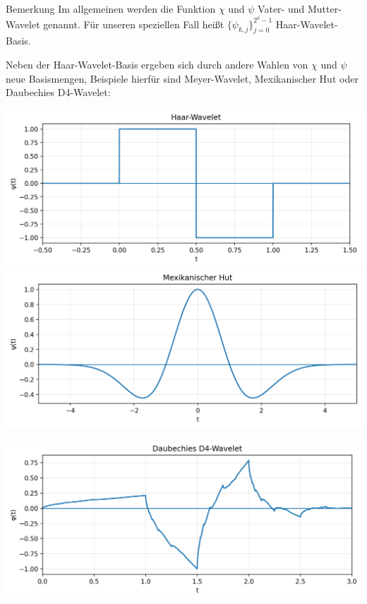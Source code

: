 \begin{colbox}{Bemerkung}
  Im allgemeinen werden die Funktion $\chi$ und $\psi$ Vater- und Mutter-Wavelet genannt. Für unseren speziellen Fall 
  heißt $\{\psi_{k,j}\}_{j=0}^{2^k-1}$ Haar-Wavelet-Basis. 

  Neben der Haar-Wavelet-Basis ergeben sich durch andere Wahlen von $\chi$ und $\psi$ neue Basismengen, Beispiele 
  hierfür sind Meyer-Wavelet, Mexikanischer Hut oder Daubechies D4-Wavelet:

  \begin{minipage}[t]{.49\textwidth}
    \includegraphics[width=\linewidth]{figures/haar_wavelet.png}\\[4pt]
    \includegraphics[width=\linewidth]{figures/mexican_hat_wavelet.png}
  \end{minipage}\hfill
  \begin{minipage}[t]{.49\textwidth}
    \includegraphics[width=\linewidth]{figures/daubechies_d4_wavelet.png}\\[4pt]

\end{minipage}
\end{colbox}
